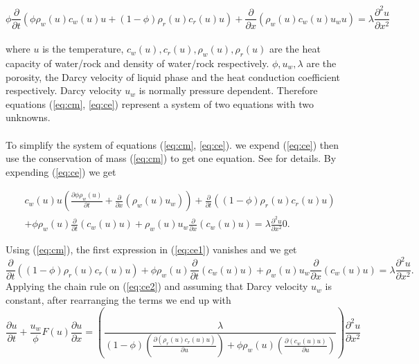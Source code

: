 \begin{equation}\label{eq:ce}
\phi\frac{\partial}{\partial t}\left (\phi \rho_{w}(u) c_{w}(u)u+(1-\phi)\rho_{r}(u) c_{r}(u)u\right) +\frac{\partial}{\partial x}(\rho_{w}(u) c_{w}(u) u_{w}u)=\lambda\frac{\partial^{2}u}{\partial x^{2}}
\end{equation}
\\
where $u$ is the temperature, $c_{w}(u), c_{r}(u), \rho_{w}(u), \rho_{r}(u)$ are the heat capacity of water/rock and density of water/rock respectively. $\phi, u_{w}, \lambda$ are the porosity, the Darcy velocity of liquid phase and the heat conduction coefficient respectively. Darcy velocity $u_{w}$ is normally pressure dependent. Therefore equations (\ref{eq:cm}, \ref{eq:ce}) represent a system of two equations with two unknowns. \\
\\
To simplify the system of equations (\ref{eq:cm}, \ref{eq:ce}). we expend (\ref{eq:ce}) then use the conservation of mass (\ref{eq:cm}) to get one equation. See \cite{Waj05} for details. By expending (\ref{eq:ce}) we get

\begin{eqnarray}\label{eq:ce1}
c_{w}(u)u\left ( \frac{\partial \phi\rho_{w}(u)}{\partial t} +\frac{\partial }{\partial x}(\rho_{w}(u)u_{w})   \right ) + \frac{\partial }{\partial t}((1-\phi)\rho_{r}(u)c_{r}(u)u)\\ \nonumber
 + \phi\rho_{w}(u)\frac{\partial }{\partial t}(c_{w}(u)u) +  \rho_{w}(u)u_{w}\frac{\partial }{\partial x}(c_{w}(u)u) =\lambda\frac{\partial^{2}u}{\partial x^{2}}0 .
\end{eqnarray}

Using (\ref{eq:cm}), the first expression in (\ref{eq:ce1}) vanishes and we get
\begin{equation}\label{eq:ce2}
  \frac{\partial }{\partial t}((1-\phi)\rho_{r}(u)c_{r}(u)u) + \phi\rho_{w}(u)\frac{\partial }{\partial t}(c_{w}(u)u) +  \rho_{w}(u)u_{w}\frac{\partial }{\partial x}(c_{w}(u)u) =\lambda\frac{\partial^{2}u}{\partial x^{2}} .
\end{equation}
Applying the chain rule on (\ref{eq:ce2}) and assuming that Darcy velocity $u_{w}$ is constant, after rearranging the terms we end up with 
\begin{equation}\label{eq:cl}
\frac{\partial u}{\partial t} +\frac{u_{w}}{\phi}F(u)\frac{\partial u}{\partial x} =\left(\frac{\lambda}{  (1-\phi)\left( \frac{ \partial (\rho_{r}(u)  c_{r}(u) u) }{\partial u}\right) +  \phi \rho_{w}(u)\left(  \frac{\partial (c_{w}(u)u)  }{\partial u  } \right)     }\right)\frac{\partial^{2}u}{\partial x^{2}}%
\end{equation}

